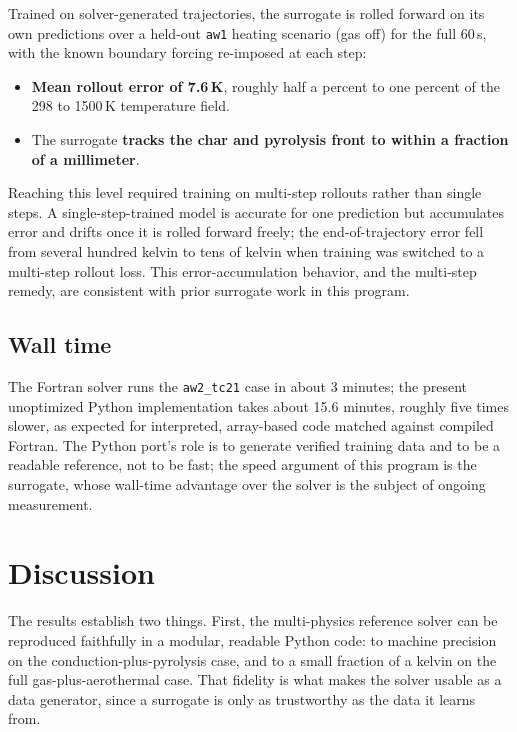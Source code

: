 \documentclass[11pt]{article}
\begin{document}
Trained on solver-generated trajectories, the surrogate is rolled forward on its
own predictions over a held-out \texttt{aw1} heating scenario (gas off) for the
full 60\,s, with the known boundary forcing re-imposed at each step:

\begin{itemize}
  \item \textbf{Mean rollout error of 7.6\,K}, roughly half a percent to one
  percent of the 298 to 1500\,K temperature field.
  \item The surrogate \textbf{tracks the char and pyrolysis front to within a
  fraction of a millimeter}.
\end{itemize}

Reaching this level required training on multi-step rollouts rather than single
steps. A single-step-trained model is accurate for one prediction but accumulates
error and drifts once it is rolled forward freely; the end-of-trajectory error
fell from several hundred kelvin to tens of kelvin when training was switched to a
multi-step rollout loss. This error-accumulation behavior, and the multi-step
remedy, are consistent with prior surrogate work in this program.

\subsection{Wall time}

The Fortran solver runs the \texttt{aw2\_tc21} case in about 3 minutes; the present
unoptimized Python implementation takes about 15.6 minutes, roughly five times
slower, as expected for interpreted, array-based code matched against compiled
Fortran. The Python port's role is to generate verified training data and to be a
readable reference, not to be fast; the speed argument of this program is the
surrogate, whose wall-time advantage over the solver is the subject of ongoing
measurement.

\section{Discussion}

The results establish two things. First, the multi-physics reference solver can be
reproduced faithfully in a modular, readable Python code: to machine precision on
the conduction-plus-pyrolysis case, and to a small fraction of a kelvin on the full
gas-plus-aerothermal case. That fidelity is what makes the solver usable as a data
generator, since a surrogate is only as trustworthy as the data it learns from.
\end{document}
